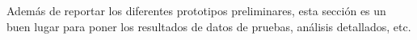 
Además de reportar los diferentes prototipos preliminares, esta sección es un buen lugar para poner los resultados de datos de pruebas, análisis detallados, etc.

